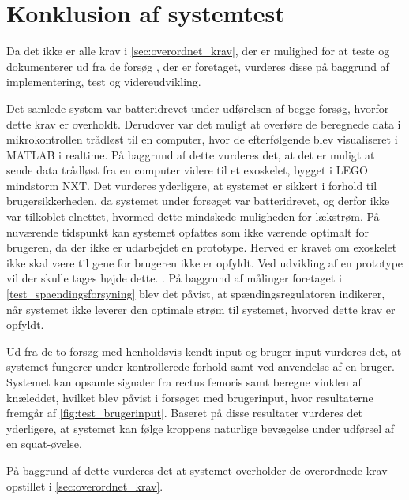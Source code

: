 \section{Konklusion af systemtest}
Da det ikke er alle krav i \autoref{sec:overordnet_krav}, der er mulighed for at teste og dokumenterer ud fra de forsøg , der er foretaget, vurderes disse på baggrund af implementering, test og videreudvikling. 

Det samlede system var batteridrevet under udførelsen af begge forsøg, hvorfor dette krav er overholdt. Derudover var det muligt at overføre de beregnede data i mikrokontrollen trådløst til en computer, hvor de efterfølgende blev visualiseret i MATLAB i realtime. På baggrund af dette vurderes det, at det er muligt at sende data trådløst fra en computer videre til et exoskelet, bygget i LEGO mindstorm NXT. Det vurderes yderligere, at systemet er sikkert i forhold til brugersikkerheden, da systemet under forsøget var batteridrevet, og derfor ikke var tilkoblet elnettet, hvormed dette mindskede muligheden for lækstrøm. 
På nuværende tidspunkt kan systemet opfattes som ikke værende optimalt for brugeren, da der ikke er udarbejdet en prototype. Herved er kravet om exoskelet ikke skal være til gene for brugeren ikke er opfyldt. Ved udvikling af en prototype vil der skulle tages højde dette. . 
På baggrund af målinger foretaget i \autoref{test_spaendingsforsyning} blev det påvist, at spændingsregulatoren indikerer, når systemet ikke leverer den optimale strøm til systemet, hvorved dette krav er opfyldt. 

Ud fra de to forsøg med henholdsvis kendt input og bruger-input vurderes det, at systemet fungerer under kontrollerede forhold samt ved anvendelse af en bruger. Systemet kan opsamle signaler fra rectus femoris samt beregne vinklen af knæleddet, hvilket blev påvist i forsøget med brugerinput, hvor resultaterne fremgår af \autoref{fig:test_brugerinput}. Baseret på disse resultater vurderes det yderligere, at systemet kan følge kroppens naturlige bevægelse under udførsel af en squat-øvelse. 

På baggrund af dette vurderes det at systemet overholder de overordnede krav opstillet i \autoref{sec:overordnet_krav}. 


